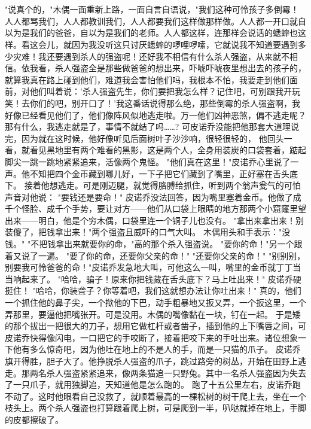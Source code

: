 \documentclass[12pt,UTF8]{ctexbook}
\begin{document}
\chapter{}

"说真个的，"木偶一面重新上路，一面自言自语说，"我们这种可怜孩子多倒霉！人人都骂我们，人人都教训我们，人人都要我们这样做那样做。人人都一开口就自以为是我们的爸爸，自以为是我们的老师。人人都这样，连那样会说话的蟋蟀也这样。看这会儿，就因为我没听这只讨厌蟋蟀的啰哩啰嗦，它就说我不知道要遇到多少灾难！我还要遇到杀人的强盗呢！还好我不相信有什么杀人强盗，从来就不相信。依我看，杀人强盗全是那些做爸爸的想出来，吓唬吓唬夜里想出去的孩子的，就算我真在路上碰到他们，难道我会害怕他们吗，我根本不怕，我要走到他们面前，对他们叫着说：'杀人强盗先生，你们要把我怎么样？记住吧，可别跟我开玩笑！去你们的吧，别开口了！'我这番话说得那么绝，那些倒霉的杀人强盗啊，我好像已经看见他们了，他们像阵风似地逃走啦。万一他们凶神恶煞，偏不逃走呢？那有什么，我逃走就是了，事情不就结了吗……?
可皮诺乔没能把他那套大道理说完，因为就在这时候，他好像听见后面树叶子沙沙响，很轻很轻的，
他回头一看，就看见黑地里有两个难看的黑影，这是两个人，全身用装炭的口袋套着，踮起脚尖一跳一跳地紧紧追来，活像两个鬼怪。
"他们真在这里！"皮诺乔心里说了一声。他不知把四个金币藏到哪儿好，一下子把它们藏到了嘴里，正好塞在舌头底下。
接着他想逃走。可是刚迈腿，就觉得胳膊给抓住，听到两个翁声瓮气的可怕声音对他说：
"要钱还是要命！"
皮诺乔没法回答，因为嘴里塞着金币。他做了成千个怪脸、成千个手势，要让对方——他们从口袋上眼睛的地方那两个小窟窿里望出来——明白，他是个穷木偶，口袋里连一个铜子儿也没有。
"拿出来拿出来！别装傻了，把钱拿出来！"两个强盗且威吓的口气大叫。
木偶用头和手表示："没钱。"
"不把钱拿出来就要你的命，"高的那个杀入强盗说。
"要你的命！"另一个跟着又说了一遍。
"要了你的命，还要你父亲的命！"
"还要你父亲的命！"
"别别别，别要我可怜爸爸的命！"皮诺乔发急地大叫，可他这么一叫，嘴里的金币就丁丁当当响起来了。
"哈哈，骗子！原来你把钱藏在舌头底下？马上吐出来！"
皮诺乔硬挺住！
"哈哈，你装聋子？你等着吧，我们这就想办法让你吐出来！"
真的，他们一个抓住他的鼻子尖，一个揿他的下巴，动手粗暴地又扳又弄，一个扳这里，一个弄那里，要逼他把嘴张开。可是没用。木偶的嘴像黏在一块，钉在一起。
于是矮的那个拔出一把很大的刀子，想用它做杠杆或者凿子，插到他的上下嘴唇之间，可皮诺乔快得像闪电，一口把它的手咬断了，接着把咬下来的手吐出来。诸位想象一下他有多么惊奇吧，因为他吐在地上的不是人的手，而是一只猫的爪子。
皮诺乔旗开得胜，胆子大了。他挣脱杀人强盗的爪子，跳过路旁的树丛，开始在田野上逃走。那两名杀人强盗紧紧追来，像两条猫追一只野兔。其中一名杀人强盗因为失去了一只爪子，就用独脚追，天知道他是怎么跑的。
跑了十五公里左右，皮诺乔跑不动了。这时他眼看自己没救了，就顺着最高的一棵松树的树干爬上去，坐在一个枝头上。两个杀人强盗也打算跟着爬上树，可是爬到一半，叭哒就掉在地上，手脚的皮都擦破了。
\end{document}
